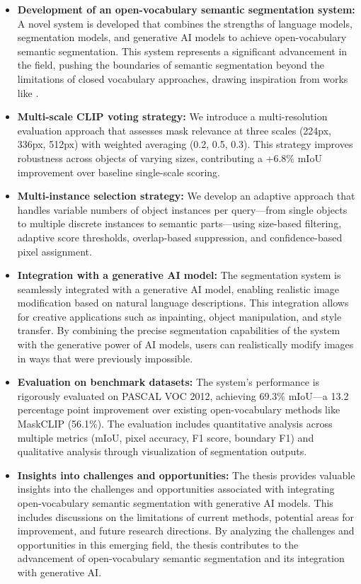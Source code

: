 \begin{itemize}
\item \textbf{Development of an open-vocabulary semantic segmentation system:} A novel system is developed that combines the strengths of language models, segmentation models, and generative AI models to achieve open-vocabulary semantic segmentation. This system represents a significant advancement in the field, pushing the boundaries of semantic segmentation beyond the limitations of closed vocabulary approaches, drawing inspiration from works like \cite{ghiasi2022open}.

\item \textbf{Multi-scale CLIP voting strategy:} We introduce a multi-resolution evaluation approach that assesses mask relevance at three scales (224px, 336px, 512px) with weighted averaging (0.2, 0.5, 0.3). This strategy improves robustness across objects of varying sizes, contributing a +6.8\% mIoU improvement over baseline single-scale scoring.

\item \textbf{Multi-instance selection strategy:} We develop an adaptive approach that handles variable numbers of object instances per query—from single objects to multiple discrete instances to semantic parts—using size-based filtering, adaptive score thresholds, overlap-based suppression, and confidence-based pixel assignment.

\item \textbf{Integration with a generative AI model:} The segmentation system is seamlessly integrated with a generative AI model, enabling realistic image modification based on natural language descriptions. This integration allows for creative applications such as inpainting, object manipulation, and style transfer. By combining the precise segmentation capabilities of the system with the generative power of AI models, users can realistically modify images in ways that were previously impossible.

\item \textbf{Evaluation on benchmark datasets:} The system's performance is rigorously evaluated on PASCAL VOC 2012, achieving 69.3\% mIoU—a 13.2 percentage point improvement over existing open-vocabulary methods like MaskCLIP (56.1\%). The evaluation includes quantitative analysis across multiple metrics (mIoU, pixel accuracy, F1 score, boundary F1) and qualitative analysis through visualization of segmentation outputs.

\item \textbf{Insights into challenges and opportunities:} The thesis provides valuable insights into the challenges and opportunities associated with integrating open-vocabulary semantic segmentation with generative AI models. This includes discussions on the limitations of current methods, potential areas for improvement, and future research directions. By analyzing the challenges and opportunities in this emerging field, the thesis contributes to the advancement of open-vocabulary semantic segmentation and its integration with generative AI.
\end{itemize}

